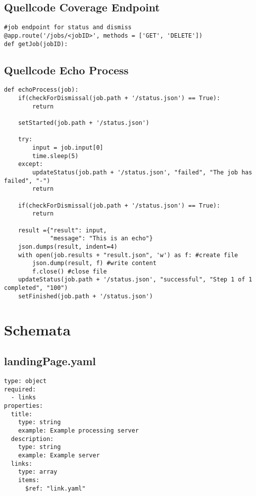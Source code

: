 \newpage
\subsection{Quellcode Coverage Endpoint}
\begin{lstlisting}[caption={Coverage Endpoint}, style = Python]
#job endpoint for status and dismiss
@app.route('/jobs/<jobID>', methods = ['GET', 'DELETE']) 
def getJob(jobID):
\end{lstlisting}\label{QuellcodeCoverage}  

\newpage
\subsection{Quellcode Echo Process}
\begin{lstlisting}[caption={Echo Process}, style = Python]
def echoProcess(job):
    if(checkForDismissal(job.path + '/status.json') == True):
        return
    
    setStarted(job.path + '/status.json')
    
    try:
        input = job.input[0]
        time.sleep(5)
    except:
        updateStatus(job.path + '/status.json', "failed", "The job has failed", "-")
        return
    
    if(checkForDismissal(job.path + '/status.json') == True):
        return
    
    result ={"result": input,
             "message": "This is an echo"}
    json.dumps(result, indent=4)
    with open(job.results + "result.json", 'w') as f: #create file
        json.dump(result, f) #write content
        f.close() #close file
    updateStatus(job.path + '/status.json', "successful", "Step 1 of 1 completed", "100")
    setFinished(job.path + '/status.json')
\end{lstlisting}\label{QuellcodeEchoProcess}  

\section{Schemata}
\renewcommand{\lstlistingname}{Schema}  
\subsection{landingPage.yaml}
\begin{lstlisting}[caption={landingPage.yaml}, style = JSON]
type: object
required:
  - links
properties:
  title:
    type: string
    example: Example processing server
  description:
    type: string
    example: Example server 
  links:
    type: array
    items:
      $ref: "link.yaml"
\end{lstlisting}\label{SchemaLandngPageyaml}  

